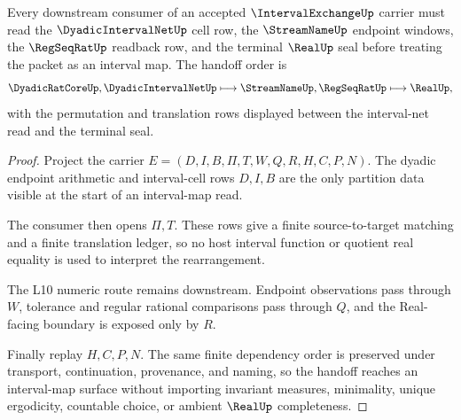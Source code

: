 \begin{theorem}
\label{thm:interval-exchange-l10-handoff}
Every downstream consumer of an accepted $\IntervalExchangeUp$ carrier must read the $\DyadicIntervalNetUp$ cell row, the $\StreamNameUp$ endpoint windows, the $\RegSeqRatUp$ readback row, and the terminal $\RealUp$ seal before treating the packet as an interval map. The handoff order is
$$
\DyadicRatCoreUp,\DyadicIntervalNetUp \longmapsto \StreamNameUp,\RegSeqRatUp \longmapsto \RealUp,
$$
with the permutation and translation rows displayed between the interval-net read and the terminal seal.
\end{theorem}
\begin{proof}
Project the carrier $E=(D,I,B,\Pi,T,W,Q,R,H,C,P,N)$. The dyadic endpoint arithmetic and interval-cell rows $D,I,B$ are the only partition data visible at the start of an interval-map read.

The consumer then opens $\Pi,T$. These rows give a finite source-to-target matching and a finite translation ledger, so no host interval function or quotient real equality is used to interpret the rearrangement.

The L10 numeric route remains downstream. Endpoint observations pass through $W$, tolerance and regular rational comparisons pass through $Q$, and the Real-facing boundary is exposed only by $R$.

Finally replay $H,C,P,N$. The same finite dependency order is preserved under transport, continuation, provenance, and naming, so the handoff reaches an interval-map surface without importing invariant measures, minimality, unique ergodicity, countable choice, or ambient $\RealUp$ completeness.
\end{proof}



